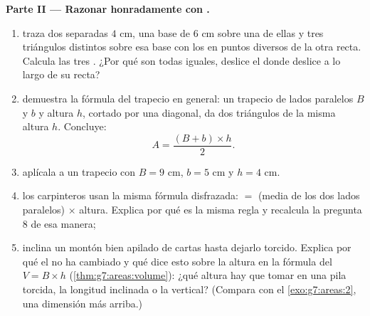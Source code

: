 \begin{problem}[{Problema de fin de semana --- una «demostración» famosa de que
$64 = 65$, desenmascarada con áreas y pendientes, con pizzas y coronas de
postre}]
\medskip
\noindent\textbf{Parte II --- Razonar honradamente con .}
\begin{enumerate}[resume]
  \item traza dos  separadas $4$ cm, una base de $6$ cm sobre
        una de ellas y tres triángulos distintos sobre esa base
        con los  en puntos diversos de la otra recta. Calcula
        las tres . ¿Por qué son todas iguales, deslice el 
        donde deslice a lo largo de su recta?
  \item demuestra la fórmula del trapecio en general: un trapecio de
        lados paralelos $B$ y $b$ y altura $h$, cortado por una
        diagonal, da dos triángulos de la misma altura $h$.
        Concluye:
        \[
        A = \frac{(B + b) \times h}{2} .
        \]
  \item aplícala a un trapecio con $B = 9$ cm, $b = 5$ cm y
        $h = 4$ cm.
  \item los carpinteros usan la misma fórmula disfrazada:  $=$
        (media de los dos lados paralelos) $\times$ altura.
        Explica por qué es la misma regla y recalcula la pregunta
        8 de esa manera;
  \item inclina un montón bien apilado de cartas hasta dejarlo torcido.
        Explica por qué el  no ha cambiado y qué dice esto
        sobre la altura en la fórmula del 
        $V = B \times h$ (\cref{thm:g7:areas:volume}): ¿qué
        altura hay que tomar en una pila torcida, la longitud
        inclinada o la vertical? (Compara con el
        \cref{exo:g7:areas:2}, una dimensión más arriba.)
\end{enumerate}


\end{problem}
